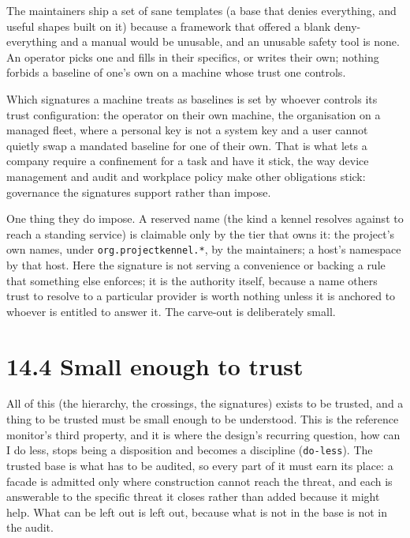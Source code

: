 The maintainers ship a set of sane templates (a base that denies
everything, and useful shapes built on it) because a framework that
offered a blank deny-everything and a manual would be unusable, and an
unusable safety tool is none. An operator picks one and fills in their
specifics, or writes their own; nothing forbids a baseline of one's own
on a machine whose trust one controls.

Which signatures a machine treats as baselines is set by whoever
controls its trust configuration: the operator on their own machine, the
organisation on a managed fleet, where a personal key is not a system
key and a user cannot quietly swap a mandated baseline for one of their
own. That is what lets a company require a confinement for a task and
have it stick, the way device management and audit and workplace policy
make other obligations stick: governance the signatures support rather
than impose.

One thing they do impose. A reserved name (the kind a kennel resolves
against to reach a standing service) is claimable only by the tier that
owns it: the project's own names, under \texttt{org.projectkennel.*}, by
the maintainers; a host's namespace by that host. Here the signature is
not serving a convenience or backing a rule that something else
enforces; it is the authority itself, because a name others trust to
resolve to a particular provider is worth nothing unless it is anchored
to whoever is entitled to answer it. The carve-out is deliberately
small.

\hypertarget{small-enough-to-trust}{%
\section{14.4 Small enough to trust}\label{small-enough-to-trust}}

All of this (the hierarchy, the crossings, the signatures) exists to be
trusted, and a thing to be trusted must be small enough to be
understood. This is the reference monitor's third property, and it is
where the design's recurring question, how can I do less, stops being a
disposition and becomes a discipline (\texttt{do-less}). The trusted
base is what has to be audited, so every part of it must earn its place:
a facade is admitted only where construction cannot reach the threat,
and each is answerable to the specific threat it closes rather than
added because it might help. What can be left out is left out, because
what is not in the base is not in the audit.

